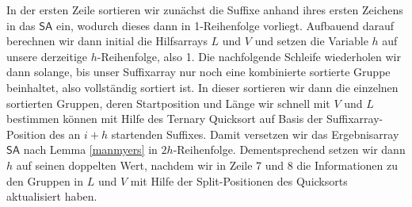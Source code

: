 In der ersten Zeile sortieren wir zunächst die Suffixe anhand ihres ersten Zeichens in das $\mathsf{SA}$ ein, wodurch dieses dann in 1-Reihenfolge vorliegt. Aufbauend darauf berechnen wir dann initial die Hilfsarrays $L$ und $V$ und setzen die Variable $h$ auf unsere derzeitige $h$-Reihenfolge, also 1.
Die nachfolgende Schleife wiederholen wir dann solange, bis unser Suffixarray nur noch eine kombinierte sortierte Gruppe beinhaltet, also vollständig sortiert ist.
In dieser sortieren wir dann die einzelnen sortierten Gruppen, deren Startposition und Länge wir schnell mit $V$ und $L$ bestimmen können mit Hilfe des Ternary Quicksort auf Basis der Suffixarray-Position des an $i+h$ startenden Suffixes. Damit versetzen wir das Ergebnisarray $\mathsf{SA}$ nach Lemma \ref{manmyers} in $2h$-Reihenfolge. Dementsprechend setzen wir dann $h$ auf seinen doppelten Wert, nachdem wir in Zeile 7 und 8 die Informationen zu den Gruppen in $L$ und $V$ mit Hilfe der Split-Positionen des Quicksorts aktualisiert haben.\\
